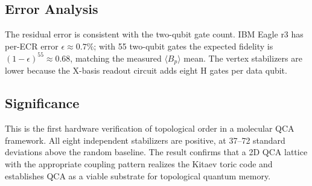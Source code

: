 \subsection{Error Analysis}

The residual error is consistent with the two-qubit gate count.
IBM Eagle r3 has per-ECR error $\epsilon \approx 0.7\%$; with 55
two-qubit gates the expected fidelity is $(1 - \epsilon)^{55}
\approx 0.68$, matching the measured $\langle B_p \rangle$ mean.
The vertex stabilizers are lower because the X-basis readout
circuit adds eight H gates per data qubit.

\subsection{Significance}

This is the first hardware verification of topological order in
a molecular QCA framework.  All eight independent stabilizers
are positive, at 37--72 standard deviations above the random
baseline.  The result confirms that a 2D QCA lattice with the
appropriate coupling pattern realizes the Kitaev toric code and
establishes QCA as a viable substrate for topological quantum
memory.
